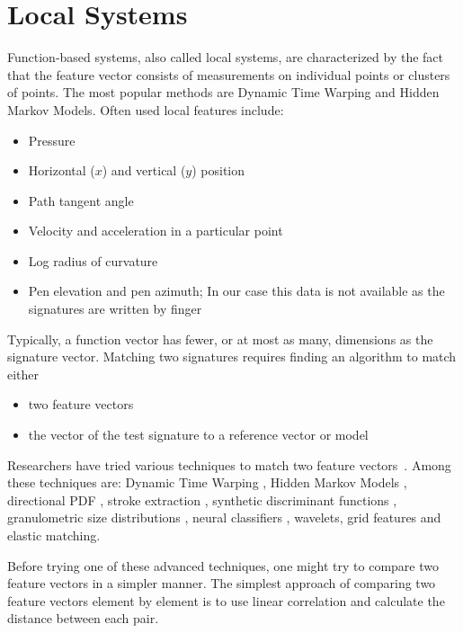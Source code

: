 \documentclass[a4paper, oneside]{csthesis}
\begin{document}
\section{Local Systems}
\label{sec:functions}


Function-based systems, also called local systems, are characterized by the fact that the feature vector consists of measurements on individual points or clusters of points.
The most popular methods are Dynamic Time Warping and Hidden Markov Models. Often used local features include:

\begin{itemize}
\item Pressure
\item Horizontal ($x$) and vertical ($y$) position
\item Path tangent angle
\item Velocity and acceleration in a particular point
\item Log radius of curvature
\item Pen elevation and pen azimuth; In our case this data is not available as the signatures are written by finger
\end{itemize}

Typically, a function vector has fewer, or at most as many, dimensions as the signature vector. Matching two signatures requires finding an algorithm to match either
\begin{itemize}
\item two feature vectors
\item the vector of the test signature to a reference vector or model
\end{itemize}

Researchers have tried various techniques to match two feature vectors~\cite{PiyushShanker:2007:OSV:1274199.1274423}. Among these techniques are: Dynamic Time Warping \cite{Herbst98onan, citeulike:891512}, Hidden Markov Models \cite{Justino00anoff-line}, directional PDF \cite{drouhard_1996_pr}, stroke extraction \cite{1047809}, synthetic discriminant functions \cite{Wilkinson:91}, granulometric size distributions \cite{615447}, neural classifiers \cite{Bajaj19971}, wavelets\cite{Ramesh1999217}, grid features\cite{Qi19941621} and elastic matching\cite{citeulike:941886}.


Before trying one of these advanced techniques, one might try to compare two feature vectors in a simpler manner.
The simplest approach of comparing two feature vectors element by element is to use linear correlation \cite{Plamondon1989107} and calculate the distance between each pair.
\end{document}
